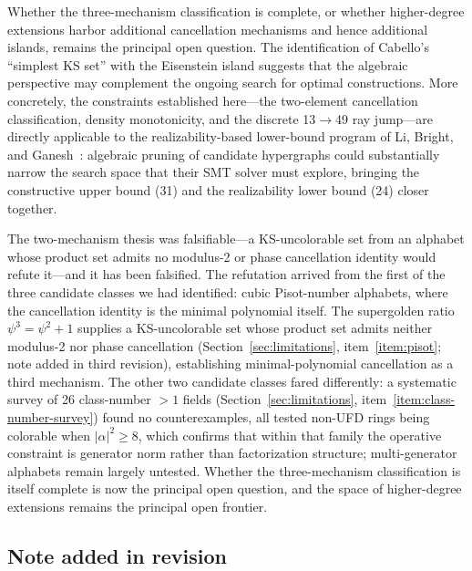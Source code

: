 \documentclass[12pt,a4paper]{article}
\begin{document}
Whether the three-mechanism classification is complete, or whether higher-degree extensions harbor additional cancellation mechanisms and hence additional islands, remains the principal open question. The identification of Cabello's ``simplest KS set'' with the Eisenstein island suggests that the algebraic perspective may complement the ongoing search for optimal constructions. More concretely, the constraints established here---the two-element cancellation classification, density monotonicity, and the discrete 13$\to$49 ray jump---are directly applicable to the realizability-based lower-bound program of Li, Bright, and Ganesh~\cite{LiBrightGanesh2024}: algebraic pruning of candidate hypergraphs could substantially narrow the search space that their SMT solver must explore, bringing the constructive upper bound (31) and the realizability lower bound (24) closer together.

The two-mechanism thesis was falsifiable---a KS-uncolorable set from an alphabet whose product set admits no modulus-2 or phase cancellation identity would refute it---and it has been falsified.  The refutation arrived from the first of the three candidate classes we had identified: cubic Pisot-number alphabets, where the cancellation identity is the minimal polynomial itself.  The supergolden ratio $\psi^3 = \psi^2 + 1$ supplies a KS-uncolorable set whose product set admits neither modulus-2 nor phase cancellation (Section~\ref{sec:limitations}, item~\ref{item:pisot}; note added in third revision), establishing minimal-polynomial cancellation as a third mechanism.  The other two candidate classes fared differently: a systematic survey of 26 class-number $> 1$ fields (Section~\ref{sec:limitations}, item~\ref{item:class-number-survey}) found no counterexamples, all tested non-UFD rings being colorable when $|\alpha|^2 \geq 8$, which confirms that within that family the operative constraint is generator norm rather than factorization structure; multi-generator alphabets remain largely untested. Whether the three-mechanism classification is itself complete is now the principal open question, and the space of higher-degree extensions remains the principal open frontier.

\subsection*{Note added in revision}
\end{document}
